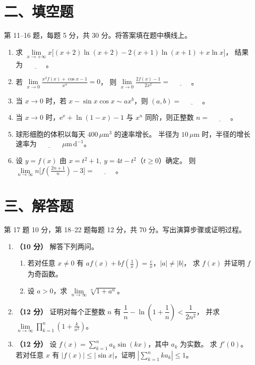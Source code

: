 \documentclass[UTF8,a4paper,zihao=-4,fontset=fandol]{ctexart}
\renewcommand{\lim}{\operatorname*{lim}\limits}
\newcommand{\blank}{\underline{\hspace{3em}}}
\newcommand{\fillsection}{%
  \section*{二、填空题}
  第 11--16 题，每题 5 分，共 30 分。将答案填在题中横线上。}
\newcommand{\solvesection}{%
  \newpage
  \section*{三、解答题}
  第 17 题 10 分，第 18--22 题每题 12 分，共 70 分。写出演算步骤或证明过程。}
\begin{document}
\fillsection
\begin{enumerate}[start=11]
\item 求 $\displaystyle\lim_{x\to+\infty}x\big[(x+2)\ln(x+2)-2(x+1)\ln(x+1)+x\ln x\big]$，
结果为 $\blank$。
\item 若 $\displaystyle\lim_{x\to0}\frac{x^2 f(x)+\cos x-1}{x^4}=0$，
则 $\displaystyle\lim_{x\to0}\frac{2f(x)-1}{2x^2}=\blank$。
\item 当 $x\to0$ 时，若 $x-\sin x\cos x\sim ax^b$，则 $(a,b)=\blank$。
\item 当 $x\to0$ 时，$\mathrm{e}^x+\ln(1-x)-1$ 与 $x^n$ 同阶，则正整数 $n=\blank$。
\item 球形细胞的体积以每天 $400\,\mu\mathrm{m}^3$ 的速率增长。
半径为 $10\,\mu\mathrm{m}$ 时，半径的增长速率为 $\blank$ $\mu\mathrm{m}\,\mathrm{d}^{-1}$。
\item 设 $y=f(x)$ 由 $x=t^2+1,\ y=4t-t^2$（$t\ge0$）确定。
则 $\displaystyle\lim_{n\to\infty}n\big[f(\frac{2n+1}{n})-3\big]=\blank$。
\end{enumerate}
\solvesection
\begin{enumerate}[start=17]
\item \textbf{（10 分）} 解答下列两问。
\begin{enumerate}[label=(\arabic*),nosep]
\item 若对任意 $x\ne0$ 有 $af(x)+bf(\frac{1}{x})=\frac{c}{x}$，$|a|\ne|b|$，
求 $f(x)$ 并证明 $f$ 为奇函数。
\item 设 $a>0$，求 $\displaystyle\lim_{n\to\infty}\sqrt[n]{1+a^n}$。
\end{enumerate}
\vspace{4.5cm}
\item \textbf{（12 分）} 证明对每个正整数 $n$ 有
$\dfrac1n-\ln(1+\dfrac1n)<\dfrac1{2n^2}$，
并求 $\displaystyle\lim_{n\to\infty}\prod_{k=1}^n(1+\frac{k}{n^2})$。
\vspace{4.5cm}
\item \textbf{（12 分）} 设 $f(x)=\sum_{k=1}^{n}a_k\sin(kx)$，其中 $a_k$ 为实数。
求 $f'(0)$。若对任意 $x$ 有 $|f(x)|\le|\sin x|$，证明 $|\sum_{k=1}^{n}ka_k|\le1$。
\end{enumerate}
\newpage
\end{document}
